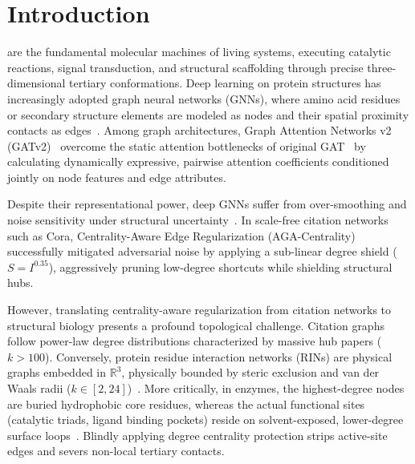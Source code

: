 \documentclass[10pt,journal,compsoc]{IEEEtran}
\begin{document}
\maketitle
\IEEEdisplaynontitleabstractindextext
\IEEEpeerreviewmaketitle

\section{Introduction}
 are the fundamental molecular machines of living systems, executing catalytic reactions, signal transduction, and structural scaffolding through precise three-dimensional tertiary conformations. Deep learning on protein structures has increasingly adopted graph neural networks (GNNs), where amino acid residues or secondary structure elements are modeled as nodes and their spatial proximity contacts as edges~\cite{gligorijevic2021structure,ingraham2019generative}. Among graph architectures, Graph Attention Networks v2 (GATv2)~\cite{brody2022how} overcome the static attention bottlenecks of original GAT~\cite{velickovic2018graph} by calculating dynamically expressive, pairwise attention coefficients conditioned jointly on node features and edge attributes.

Despite their representational power, deep GNNs suffer from over-smoothing and noise sensitivity under structural uncertainty~\cite{rong2020dropedge}. In scale-free citation networks such as Cora, Centrality-Aware Edge Regularization (AGA-Centrality) successfully mitigated adversarial noise by applying a sub-linear degree shield ($S = I^{0.35}$), aggressively pruning low-degree shortcuts while shielding structural hubs. 

However, translating centrality-aware regularization from citation networks to structural biology presents a profound topological challenge. Citation graphs follow power-law degree distributions characterized by massive hub papers ($k > 100$). Conversely, protein residue interaction networks (RINs) are physical graphs embedded in $\mathbb{R}^3$, physically bounded by steric exclusion and van der Waals radii ($k \in [2, 24]$)~\cite{amitai2004network}. More critically, in enzymes, the highest-degree nodes are buried hydrophobic core residues, whereas the actual functional sites (catalytic triads, ligand binding pockets) reside on solvent-exposed, lower-degree surface loops~\cite{delsol2006residues}. Blindly applying degree centrality protection strips active-site edges and severs non-local tertiary contacts.
\end{document}
